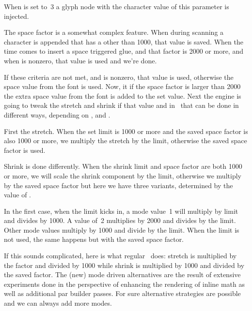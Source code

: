 \stopnewprimitive

\startnewprimitive[title={\prm {spacechar}}]

When  is set to~3 a glyph node with the character value of
this parameter is injected.

\stopnewprimitive

\startoldprimitive[title={\prm {spacefactor}}]

The space factor is a somewhat complex feature. When during scanning a character
is appended that has a  other than 1000, that value is saved. When
the time comes to insert a space triggered glue, and that factor is 2000 or more,
and when  is nonzero, that value is used and we're done.

If these criteria are not met, and  is nonzero, that value is
used, otherwise the space value from the font is used. Now, it if the space factor
is larger than 2000 the extra space value from the font is added to the set value.
Next the engine is going to tweak the stretch and shrink if that value and in
\LUAMETATEX\ that can be done in different ways, depending on ,
 and .

First the stretch. When the set limit is 1000 or more and the saved space factor
is also 1000 or more, we multiply the stretch by the limit, otherwise the saved
space factor is used.

Shrink is done differently. When the shrink limit and space factor are both 1000
or more, we will scale the shrink component by the limit, otherwise we multiply
by the saved space factor but here we have three variants, determined by the
value of .

In the first case, when the limit kicks in, a mode value~1 will multiply by limit
and divides by 1000. A value of~2 multiplies by 2000 and divides by the limit.
Other mode values multiply by 1000 and divide by the limit. When the limit is not
used, the same happens but with the saved space factor.

If this sounds complicated, here is what regular \TEX\ does: stretch is
multiplied by the factor and divided by 1000 while shrink is multiplied by 1000
and divided by the saved factor. The (new) mode driven alternatives are the
result of extensive experiments done in the perspective of enhancing the
rendering of inline math as well as additional par builder passes. For sure
alternative strategies are possible and we can always add more modes.

